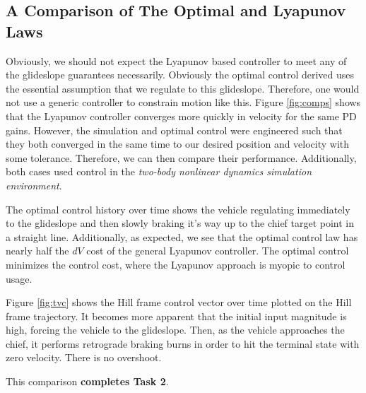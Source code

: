 \documentclass[conf]{new-aiaa}
\begin{document}
\begin{singlespace}
\subsection{A Comparison of The Optimal and Lyapunov Laws}
Obviously, we should not expect the Lyapunov based controller to meet any of the glideslope guarantees necessarily. Obviously the optimal control derived  uses the essential assumption that we regulate to this glideslope. Therefore, one would not use a generic controller to constrain motion like this. Figure \ref{fig:comps} shows that the Lyapunov controller converges more quickly in velocity for the same PD gains. However, the simulation and optimal control were engineered such that they both converged in the same time to our desired position and velocity with some tolerance. Therefore, we can then compare their performance. Additionally, both cases used control in the \textit{two-body nonlinear dynamics simulation environment}.

The optimal control history over time shows the vehicle regulating immediately to the glideslope and then slowly braking it's way up to the chief target point in a straight line. Additionally, as expected, we see that the optimal control law has nearly half the $dV$ cost of the general Lyapunov controller. The optimal control minimizes the control cost, where the Lyapunov approach is myopic to control usage.

Figure \ref{fig:tvc} shows the Hill frame control vector over time plotted on the Hill frame trajectory. It becomes more apparent that the initial input magnitude is  high, forcing the vehicle to the glideslope. Then, as the vehicle approaches the chief, it performs retrograde braking burns in order to hit the terminal state with zero velocity. There is no overshoot.

This comparison \textbf{completes Task 2}.




\end{singlespace}
\end{document}
